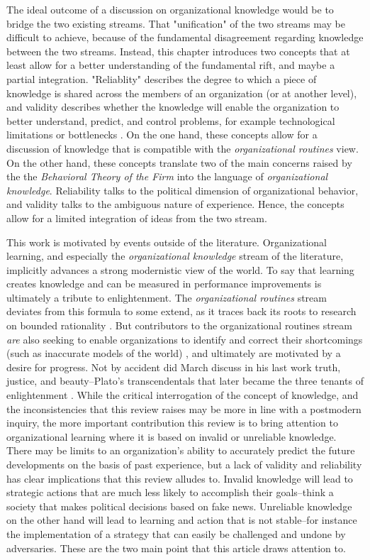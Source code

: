 The ideal outcome of a discussion on organizational knowledge would be to bridge the two existing streams. That "unification" of the two streams may be difficult to achieve, because of the fundamental disagreement regarding knowledge between the two streams. Instead, this chapter introduces two concepts that at least allow for a better understanding of the fundamental rift, and maybe a partial integration. "Reliablity" describes the degree to which a piece of knowledge is shared across the members of an organization (or at another level), and validity describes whether the knowledge will enable the organization to better understand, predict, and control problems, for example technological limitations or bottlenecks \cite{Rerup2020}. On the one hand, these concepts allow for a discussion of knowledge that is compatible with the \textit{organizational routines} view. On the other hand, these concepts translate two of the main concerns raised by the the \textit{Behavioral Theory of the Firm} into the language of \textit{organizational knowledge}. Reliability talks to the political dimension of organizational behavior, and validity talks to the ambiguous nature of experience. Hence, the concepts allow for a limited integration of ideas from the two stream.

This work is motivated by events outside of the literature. Organizational learning, and especially the \textit{organizational knowledge} stream of the literature, implicitly advances a strong modernistic view of the world. To say that learning creates knowledge and can be measured in performance improvements is ultimately a tribute to enlightenment. The \textit{organizational routines} stream deviates from this formula to some extend, as it traces back its roots to research on bounded rationality \citep{March1963}. But contributors to the organizational routines stream \textit{are} also seeking to enable organizations to identify and correct their shortcomings (such as inaccurate models of the world) \citep[e.g.,][]{Argyris1978}, and ultimately are motivated by a desire for progress. Not by accident did March discuss in his last work truth, justice, and beauty--Plato's transcendentals that later became the three tenants of enlightenment \citep{March2010}. While the critical interrogation of the concept of knowledge, and the inconsistencies that this review raises may be more in line with a postmodern inquiry, the more important contribution this review is to bring attention to organizational learning where it is based on invalid or unreliable knowledge. There may be limits to an organization's ability to accurately predict the future developments on the basis of past experience, but a lack of validity and reliability has clear implications that this review alludes to. Invalid knowledge will lead to strategic actions that are much less likely to accomplish their goals--think a society that makes political decisions based on fake news. Unreliable knowledge on the other hand will lead to learning and action that is not stable--for instance the implementation of a strategy that can easily be challenged and undone by adversaries. These are the two main point that this article draws attention to.

